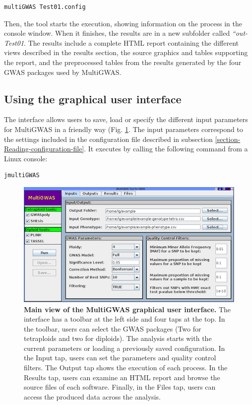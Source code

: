 \documentclass{article}
\begin{document}
\begin{lstlisting}[language=bash,basicstyle={\small}]
multiGWAS Test01.config
\end{lstlisting}

Then, the tool starts the execution, showing information on the process in the console window. When it finishes, the results are in a new subfolder called \emph{``out-Test01}.  The results include a complete HTML report containing the different views described in the results section, the source graphics and tables supporting the report, and the preprocessed tables from the results generated by the four GWAS packages used by MultiGWAS.


\subsection{Using the graphical user interface}
The interface allows users to save, load or specify the different input parameters for MultiGWAS in a friendly way (Fig. \ref{fig:MultiGWAS-interaction}. The input parameters correspond to the settings included in the configuration file described in subsection \ref{section-Reading-configuration-file}. It executes by calling the following command from a Linux console:

\begin{lstlisting}[language=bash,basicstyle={\small}]
jmultiGWAS
\end{lstlisting}

\begin{figure}[H]
\begin{centering}
\includegraphics[scale=0.5]{images/paper-implementation-jmultiGWAS}
\par\end{centering}
\caption{\textbf{Main view of the MultiGWAS graphical user interface.}  The interface has a toolbar at the left side and four taps at the top. In the toolbar, users can select the GWAS packages (Two for tetraploids and two for diploids). The analysis starts with the current parameters or loading a previously saved configuration. In the Input tap, users can set the parameters and quality control filters. The Output tap shows the execution of each process. In the Results tap, users can examine an HTML report and browse the source files of each software. Finally, in the Files tap, users can access the produced data across the analysis.}\label{fig:MultiGWAS-interaction} 
\end{figure}
\end{document}
